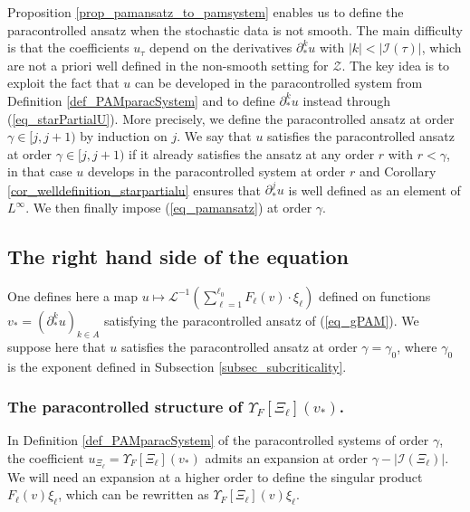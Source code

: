 \documentclass[11pt]{preprint}
\newcommand{\mcI}{\mathcal{I}}
\newcommand{\mcZ}{\mathcal{Z}}
\def\eqref#1{(\ref{#1})}
\newcommand{\scrL}{\mathscr{L}}
\newcommand{\Linv}{\scrL^{-1}}
\begin{document}
	
	Proposition \ref{prop_pamansatz_to_pamsystem} enables us to define the paracontrolled ansatz when the stochastic data is not smooth. The main difficulty is that the coefficients $u_\tau$ depend on the derivatives $\partial_*^k u$ with $|k|<|\mcI(\tau)|$, which are not a priori well defined in the non-smooth setting for $\mcZ$. The key idea is to exploit the fact that $u$ can be developed in the paracontrolled system from Definition \ref{def_PAMparacSystem} and to define $\partial_*^k u$ instead through \eqref{eq_starPartialU}. More precisely, we define the paracontrolled ansatz at order $\gamma\in [j,j+1)$ by induction on $j$. We say that $u$ satisfies the paracontrolled ansatz at order $\gamma\in[j,j+1)$ if it already satisfies the ansatz at any order $r$ with $r<\gamma$, in that case $u$ develops in the paracontrolled system at order $r$ and Corollary \ref{cor_welldefinition_starpartialu} ensures that $\partial^j_*u$ is well defined as an element of $L^\infty$. We then finally impose \eqref{eq_pamansatz} at order $\gamma$.     
	
	
	
	
	\subsection{The right hand side of the equation} \label{Subsection_RHS}
	
	
	One defines here a map $u\mapsto \Linv (\sum_{\ell=1}^{\ell_0} F_\ell(v) \cdot \xi_\ell  ) $ defined on functions $ v_* = (\partial_{*}^{k} u)_{k \in A}$ satisfying the  paracontrolled ansatz of \eqref{eq_gPAM}. We suppose here that $u$ satisfies the paracontrolled ansatz at order $\gamma = \gamma_0$, where $\gamma_0$ is the exponent defined in Subsection \ref{subsec_subcriticality}.
	
	
	
	\subsubsection{The paracontrolled structure of $\Upsilon_F[\Xi_\ell](v_*)$.}	 \label{subsect_paracstructure_UpsilonXi}
	
	
	In Definition \ref{def_PAMparacSystem} of the paracontrolled systems of order $\gamma$, the coefficient $u_{\Xi_\ell}= \Upsilon_F[\Xi_\ell](v_*)$ admits an expansion at order $\gamma-|\mcI(\Xi_\ell)|$. We will need an expansion at a higher order to define the singular product $F_\ell(v)\xi_\ell$, which can be rewritten as $\Upsilon_F[\Xi_\ell](v)\xi_\ell$.
	
\end{document}

